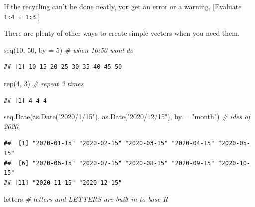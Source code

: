 \documentclass[
]{book}
\newenvironment{Shaded}{\begin{snugshade}}{\end{snugshade}}
\newcommand{\AttributeTok}[1]{\textcolor[rgb]{0.77,0.63,0.00}{#1}}
\newcommand{\CommentTok}[1]{\textcolor[rgb]{0.56,0.35,0.01}{\textit{#1}}}
\newcommand{\DecValTok}[1]{\textcolor[rgb]{0.00,0.00,0.81}{#1}}
\newcommand{\FunctionTok}[1]{\textcolor[rgb]{0.00,0.00,0.00}{#1}}
\newcommand{\NormalTok}[1]{#1}
\newcommand{\StringTok}[1]{\textcolor[rgb]{0.31,0.60,0.02}{#1}}
\begin{document}
If the recycling can't be done neatly, you get an error or a warning. {[}Evaluate \texttt{1:4\ +\ 1:3}.{]}

There are plenty of other ways to create simple vectors when you need them.

\begin{Shaded}
\begin{Highlighting}[]
\FunctionTok{seq}\NormalTok{(}\DecValTok{10}\NormalTok{, }\DecValTok{50}\NormalTok{, }\AttributeTok{by =} \DecValTok{5}\NormalTok{) }\CommentTok{\# when 10:50 won\textquotesingle{}t do}
\end{Highlighting}
\end{Shaded}

\begin{verbatim}
## [1] 10 15 20 25 30 35 40 45 50
\end{verbatim}

\begin{Shaded}
\begin{Highlighting}[]
\FunctionTok{rep}\NormalTok{(}\DecValTok{4}\NormalTok{, }\DecValTok{3}\NormalTok{) }\CommentTok{\# repeat 3 times}
\end{Highlighting}
\end{Shaded}

\begin{verbatim}
## [1] 4 4 4
\end{verbatim}

\begin{Shaded}
\begin{Highlighting}[]
\FunctionTok{seq.Date}\NormalTok{(}\FunctionTok{as.Date}\NormalTok{(}\StringTok{"2020/1/15"}\NormalTok{), }\FunctionTok{as.Date}\NormalTok{(}\StringTok{"2020/12/15"}\NormalTok{), }\AttributeTok{by =} \StringTok{"month"}\NormalTok{) }\CommentTok{\# ides of 2020}
\end{Highlighting}
\end{Shaded}

\begin{verbatim}
##  [1] "2020-01-15" "2020-02-15" "2020-03-15" "2020-04-15" "2020-05-15"
##  [6] "2020-06-15" "2020-07-15" "2020-08-15" "2020-09-15" "2020-10-15"
## [11] "2020-11-15" "2020-12-15"
\end{verbatim}

\begin{Shaded}
\begin{Highlighting}[]
\NormalTok{letters }\CommentTok{\# \textquotesingle{}letters\textquotesingle{} and \textquotesingle{}LETTERS\textquotesingle{} are built in to base R}
\end{Highlighting}
\end{Shaded}
\end{document}
